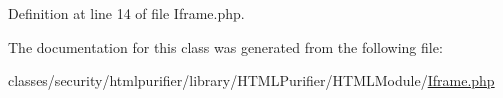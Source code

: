 Definition at line 14 of file Iframe.\+php.



The documentation for this class was generated from the following file\+:\begin{DoxyCompactItemize}
\item 
classes/security/htmlpurifier/library/\+H\+T\+M\+L\+Purifier/\+H\+T\+M\+L\+Module/\hyperlink{Iframe_8php}{Iframe.\+php}\end{DoxyCompactItemize}
